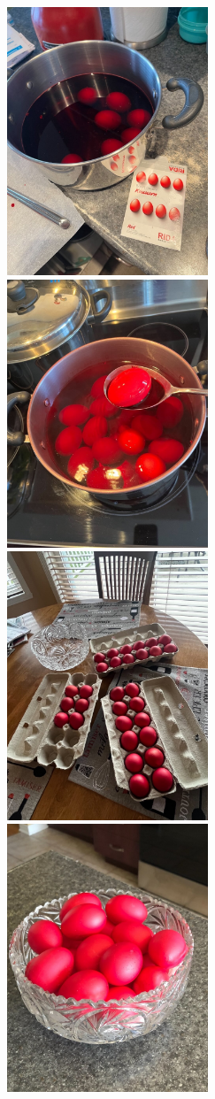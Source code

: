 \begin{figure}
  \includegraphics[width=60mm]{monanteras/images/Eggs 3.jpg}
  \includegraphics[width=60mm]{monanteras/images/Eggs 5.jpg}
  \includegraphics[width=60mm]{monanteras/images/Eggs 4.jpg}
  \includegraphics[width=60mm]{monanteras/images/Eggs 7.jpg}
\end{figure}
